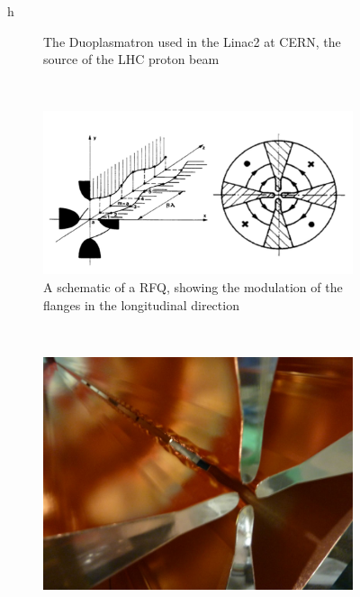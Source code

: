 \begin{figure}{h}
\begin{subfigure}[h]{0.4\textwidth}
        \caption{The Duoplasmatron used in the Linac2 at CERN, the
          source of the LHC proton beam}\label{fig:duoplasmatron_actual}
      \end{subfigure}
       ~ %
      \begin{subfigure}[h]{0.4\textwidth}
        \includegraphics[width=\textwidth]{Figures/LHC_Diagrams/LHC__Linac2__RFQ_schematic.jpg}
        \caption{A schematic of a RFQ, showing the modulation of the
          flanges in the longitudinal direction}\label{fig:rfq_schematic}
      \end{subfigure}
       ~ %
      \begin{subfigure}[h]{0.4\textwidth}
        \includegraphics[width=\textwidth]{Figures/LHC_Diagrams/LHC__Linac2__RFQ.jpg}

\end{subfigure}
\end{figure}
